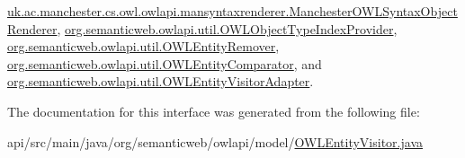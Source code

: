 \hyperlink{classuk_1_1ac_1_1manchester_1_1cs_1_1owl_1_1owlapi_1_1mansyntaxrenderer_1_1_manchester_o_w_l_syntax_object_renderer_a802006facd974ed6301734e72cf1a6f5}{uk.\-ac.\-manchester.\-cs.\-owl.\-owlapi.\-mansyntaxrenderer.\-Manchester\-O\-W\-L\-Syntax\-Object\-Renderer}, \hyperlink{classorg_1_1semanticweb_1_1owlapi_1_1util_1_1_o_w_l_object_type_index_provider_a228a359c2df51dd2d5002d55bd9ab2c1}{org.\-semanticweb.\-owlapi.\-util.\-O\-W\-L\-Object\-Type\-Index\-Provider}, \hyperlink{classorg_1_1semanticweb_1_1owlapi_1_1util_1_1_o_w_l_entity_remover_afc66dd79f7bfa2ee997af485fb35d398}{org.\-semanticweb.\-owlapi.\-util.\-O\-W\-L\-Entity\-Remover}, \hyperlink{classorg_1_1semanticweb_1_1owlapi_1_1util_1_1_o_w_l_entity_comparator_a7dfef2abb274eaa3f26780ba815259b1}{org.\-semanticweb.\-owlapi.\-util.\-O\-W\-L\-Entity\-Comparator}, and \hyperlink{classorg_1_1semanticweb_1_1owlapi_1_1util_1_1_o_w_l_entity_visitor_adapter_a7768d1a4df561951d5eb2e418fc26e3c}{org.\-semanticweb.\-owlapi.\-util.\-O\-W\-L\-Entity\-Visitor\-Adapter}.



The documentation for this interface was generated from the following file\-:\begin{DoxyCompactItemize}
\item 
api/src/main/java/org/semanticweb/owlapi/model/\hyperlink{_o_w_l_entity_visitor_8java}{O\-W\-L\-Entity\-Visitor.\-java}\end{DoxyCompactItemize}
